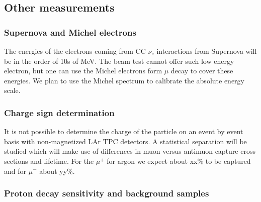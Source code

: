 


\subsection{Other measurements} 
\label{sec_other}

\subsubsection{Supernova and Michel electrons}
The energies of the electrons coming from CC $\nu_e$ interactions from Supernova will be in the order of 10s of MeV. 
The beam test cannot offer such low energy electron, but one can use the Michel electrons form $\mu$ decay to cover these energies. 
 We plan to use the Michel spectrum to calibrate the absolute energy scale. 




\subsubsection{Charge sign determination}
It is not possible to determine the charge of the particle on an event by event basis with non-magnetized LAr TPC detectors. A statistical separation will be studied which will make use of differences in muon versus antimuon capture cross sections and lifetime.
For the $\mu^+$ for argon we expect about xx\% to be captured and for $\mu^-$ about yy\%. 




\subsubsection{Proton decay sensitivity and background samples}



